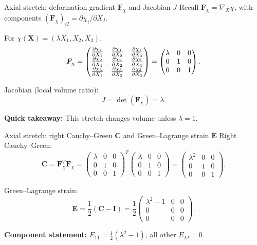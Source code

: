 \documentclass[aspectratio=169]{beamer}
\newcommand{\X}{\bm{X}}
\newcommand{\I}{\bm{I}}
\newcommand{\gradX}{\nabla_{\!X}}
\newcommand{\Cten}{\bm{C}}     %
\newcommand{\Eten}{\bm{E}}     %
\newcommand{\Fdef}{\bm{F}_{\chi}}  %
\begin{document}
\begin{frame}{Axial stretch: deformation gradient \(\Fdef\) and Jacobian \(J\)}
\small
Recall \(\Fdef = \gradX \chi\), with components \((\Fdef)_{iI}=\partial \chi_i/\partial X_I\).

\medskip
For \(\chi(\X)=(\lambda X_1, X_2, X_3)\),
\[
\Fdef =
\begin{pmatrix}
\pdv{\chi_1}{X_1} & \pdv{\chi_1}{X_2} & \pdv{\chi_1}{X_3}\\
\pdv{\chi_2}{X_1} & \pdv{\chi_2}{X_2} & \pdv{\chi_2}{X_3}\\
\pdv{\chi_3}{X_1} & \pdv{\chi_3}{X_2} & \pdv{\chi_3}{X_3}
\end{pmatrix}
=
\begin{pmatrix}
\lambda & 0 & 0\\
0 & 1 & 0\\
0 & 0 & 1
\end{pmatrix}.
\]

\medskip
Jacobian (local volume ratio):
\[
J=\det(\Fdef)=\lambda.
\]

\medskip
\textbf{Quick takeaway:} This stretch changes volume unless \(\lambda=1\).

\end{frame}

\begin{frame}{Axial stretch: right Cauchy--Green \(\Cten\) and Green--Lagrange strain \(\Eten\)}
\small
Right Cauchy--Green:
\[
\Cten=\Fdef^T\Fdef
=
\begin{pmatrix}
\lambda & 0 & 0\\
0 & 1 & 0\\
0 & 0 & 1
\end{pmatrix}^T
\begin{pmatrix}
\lambda & 0 & 0\\
0 & 1 & 0\\
0 & 0 & 1
\end{pmatrix}
=
\begin{pmatrix}
\lambda^2 & 0 & 0\\
0 & 1 & 0\\
0 & 0 & 1
\end{pmatrix}.
\]

\medskip
Green--Lagrange strain:
\[
\Eten=\frac12(\Cten-\I)
=
\frac12\begin{pmatrix}
\lambda^2-1 & 0 & 0\\
0 & 0 & 0\\
0 & 0 & 0
\end{pmatrix}.
\]

\medskip
\textbf{Component statement:} \(E_{11}=\tfrac12(\lambda^2-1)\), all other \(E_{IJ}=0\).

\end{frame}
\end{document}
